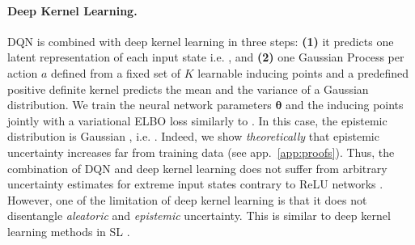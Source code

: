 \paragraph{Deep Kernel Learning.} DQN is combined with deep kernel learning \cite{due} in three steps: \textbf{(1)} it predicts one latent representation of each input state i.e. , and \textbf{(2)} one Gaussian Process per action $a$ defined from a fixed set of $K$ learnable inducing points  and a predefined positive definite kernel \smash{$\kappa(\cdot, \cdot)$} predicts the mean  and the variance  of a Gaussian distribution. We train the neural network parameters $\bm{\theta}$ and the inducing points  jointly with a variational ELBO loss similarly to \cite{due}. In this case, the epistemic distribution is Gaussian \cite{simple-baseline-uncertainty}, i.e. . Indeed, we show \emph{theoretically} that epistemic uncertainty increases far from training data (see app.~\ref{app:proofs}). Thus, the combination of DQN and deep kernel learning does not suffer from arbitrary uncertainty estimates for extreme input states contrary to ReLU networks \cite{overconfident-relu}. However, one of the limitation of deep kernel learning is that it does not disentangle \emph{aleatoric} and \emph{epistemic} uncertainty. This is similar to deep kernel learning methods in SL \cite{simple-baseline-uncertainty, due, duq}.

